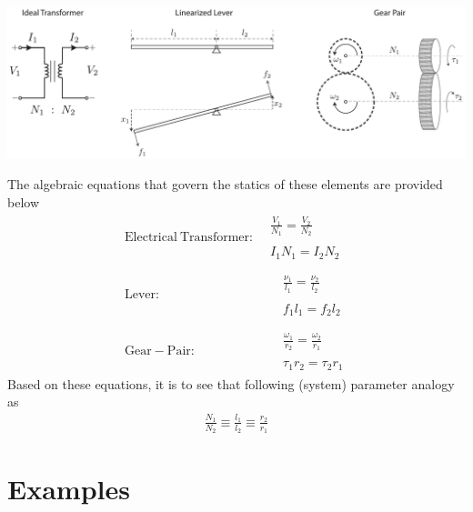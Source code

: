 \documentclass[twoside]{article}
\theoremstyle{definition}
\begin{document}
  \begin{minipage}[h]{1\linewidth}
    \begin{center}
      \includegraphics[width=1\textwidth]{trans}
    \end{center}
  \end{minipage}

The algebraic equations that govern the statics of these elements are provided below
%
%
\begin{align*}
\mathrm{Electrical} \ \mathrm{Transformer:}& \begin{array}{c} \frac{V_1}{N_1} =
                                    \frac{V_2}{N_2} \\ \\ I_1 N_1 = I_2 N_2 \end{array} 
\\ \\
\mathrm{Lever:}& \quad  \begin{array}{c} \frac{\nu_1}{l_1} =
                                    \frac{\nu_2}{l_2} \\ \\ f_1 l_1 = f_2 l_2 \end{array} 
\\ \\
\mathrm{Gear-Pair:}& \quad  \begin{array}{c} \frac{\omega_1}{r_2} =
                                    \frac{\omega_2}{r_1} \\ \\ \tau_1 r_2 = \tau_2 r_1 \end{array} 
\end{align*}
%
Based on these equations, it is to see that following (system) parameter
analogy as
%
\begin{align*}
\frac{N_1}{N_2} \equiv \frac{l_1}{l_2} \equiv \frac{r_2}{r_1} 
\end{align*}
%

\newpage

\section{Examples}
\end{document}
